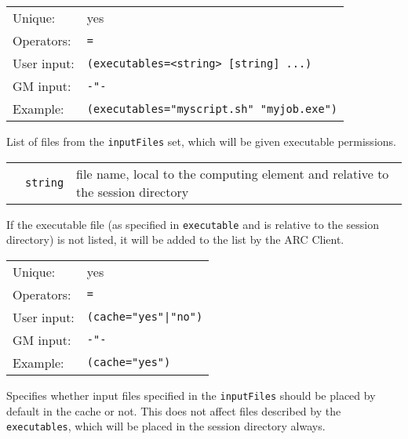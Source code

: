   \hspace*{0.5cm}
  \begin{shaded}
  \end{shaded}
  \begin{tabular}{lp{13cm}}
    Unique:&yes\\
    Operators:&\verb#=#\\
    User input:&\verb#(executables=<string> [string] ...)#\\
    GM input:&\verb#-"-#\\
    Example:&\verb#(executables="myscript.sh" "myjob.exe")#\\
  \end{tabular}

  List of files from the \texttt{inputFiles} set, which will be given
  executable permissions.

  \begin{tabular}{llp{10cm}}
    \hspace*{1cm}&\texttt{string}& file name, local to the computing element and
    relative to the session directory\\
  \end{tabular}

  If the executable file (as specified in \texttt{executable} and is
  relative to the session directory)  is not listed, it will be added
  to the list by the ARC Client.

  \hspace*{0.5cm}
  \begin{shaded}
  \end{shaded}
  \begin{tabular}{lp{13cm}}
    Unique:&yes\\
    Operators:&\verb#=#\\
    User input:&\verb#(cache="yes"|"no")#\\
    GM input:&\verb#-"-#\\
    Example:&\verb#(cache="yes")#\\
  \end{tabular}

  Specifies whether input files specified in the \texttt{inputFiles}
  should be placed by default in the cache or not. This does not
  affect files described by the \texttt{executables}, which will be
  placed in the session directory always.

